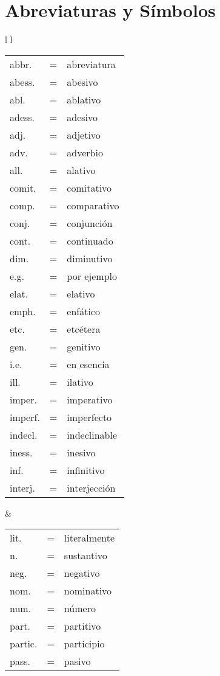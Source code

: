 \section{Abreviaturas y Símbolos}

\bigskip
\begin{tabular}{ l l }
	\begin{tabular}{ l c l }
	abbr.	& = & abreviatura \\
	abess.	& = & abesivo \\
	abl.	& = & ablativo \\
	adess.	& = & adesivo \\
	adj.	& = & adjetivo \\
	adv.	& = & adverbio \\
	all.	& = & alativo \\
	comit.	& = & comitativo \\
	comp.	& = & comparativo \\
	conj.	& = & conjunción \\
	cont.	& = & continuado \\
	dim.	& = & diminutivo \\
	e.g.	& = & por ejemplo \\
	elat.	& = & elativo \\
	emph.	& = & enfático \\
	etc.	& = & etcétera \\
	gen.	& = & genitivo \\
	i.e.	& = & en esencia \\
	ill.	& = & ilativo \\
	imper.	& = & imperativo \\
	imperf.	& = & imperfecto \\
	indecl.	& = & indeclinable \\
	iness.	& = & inesivo \\
	inf.	& = & infinitivo \\
	interj.	& = & interjección
	\end{tabular}
&
	\begin{tabular}{ l c l }
	lit.	& = & literalmente \\
	n.		& = & sustantivo \\
	neg.	& = & negativo \\
	nom.	& = & nominativo \\
	num.	& = & número \\
	part.	& = & partitivo \\
	partic.	& = & participio \\
	pass.	& = & pasivo \\

\end{tabular}
\end{tabular}
